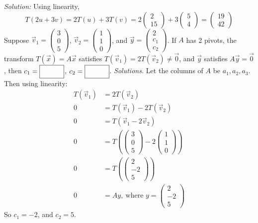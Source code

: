     \ifnum {} {\color{DarkBlue} \textit{Solution:} Using linearity, $$T(2u+3v) = 2T(u) + 3T(v) = 2\begin{pmatrix} 2\\15\end{pmatrix} + 3\begin{pmatrix} 5\\4 \end{pmatrix} = \begin{pmatrix}19\\42 \end{pmatrix}$$  } \fi    
\fi 
\ifnum {} %
    Suppose $\vec v_1= \begin{pmatrix}3\\0\\5 \end{pmatrix}$, $\vec v_2 = \begin{pmatrix}1\\1\\0 \end{pmatrix}$, and $\vec y = \begin{pmatrix} 2\\c_1\\c_2\end{pmatrix}$. If $A$ has 2 pivots, the transform $T(\vec x)=A\vec x$ satisfies $T(\vec v_1) = 2T(\vec v_2) \ne \vec 0$, and $\vec y$ satisfies $A\vec y = \vec 0$, then $c_1 = \framebox{\strut\hspace{1cm}}$, $c_2 = \framebox{\strut\hspace{1cm}}$.  
    \ifnum {} {\color{DarkBlue} \textit{Solutions.} 
        Let the columns of $A$ be $a_1, a_2, a_3$. Then using linearity: 
        \begin{align}
            T(\vec v_1) &= 2T(\vec v_2) \\
            0 & = T(\vec v_1) - 2T(\vec v_2) \\
            0 & = T(\vec v_1 - 2\vec v_2) \\
            0 & = T\left( \begin{pmatrix}3\\0\\5 \end{pmatrix}- 2 \begin{pmatrix}1\\1\\0 \end{pmatrix} \right) \\
            0 & = T\left( \begin{pmatrix}2\\-2\\5 \end{pmatrix}\right) \\
            0 & = A y , \ \text{where } y = \begin{pmatrix}2\\-2\\5 \end{pmatrix} 
        \end{align}
        So $c_1 = -2$, and $c_2 = 5$. 
        } 
